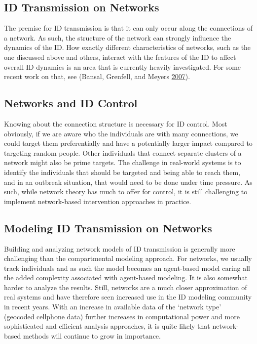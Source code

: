 \documentclass[]{article}
\theoremstyle{definition}
\theoremstyle{definition}
\theoremstyle{definition}
\theoremstyle{remark}
\begin{document}
\subsection{ID Transmission on
Networks}\label{id-transmission-on-networks}

The premise for ID transmission is that it can only occur along the
connections of a network. As such, the structure of the network can
strongly influence the dynamics of the ID. How exactly different
characteristics of networks, such as the one discussed above and others,
interact with the features of the ID to affect overall ID dynamics is an
area that is currently heavily investigated. For some recent work on
that, see (Bansal, Grenfell, and Meyers
\protect\hyperlink{ref-bansal07}{2007}).

\subsection{Networks and ID Control}\label{networks-and-id-control}

Knowing about the connection structure is necessary for ID control. Most
obviously, if we are aware who the individuals are with many
connections, we could target them preferentially and have a potentially
larger impact compared to targeting random people. Other individuals
that connect separate clusters of a network might also be prime targets.
The challenge in real-world systems is to identify the individuals that
should be targeted and being able to reach them, and in an outbreak
situation, that would need to be done under time pressure. As such,
while network theory has much to offer for control, it is still
challenging to implement network-based intervention approaches in
practice.

\subsection{Modeling ID Transmission on
Networks}\label{modeling-id-transmission-on-networks}

Building and analyzing network models of ID transmission is generally
more challenging than the compartmental modeling approach. For networks,
we usually track individuals and as such the model becomes an
agent-based model caring all the added complexity associated with
agent-based modeling. It is also somewhat harder to analyze the results.
Still, networks are a much closer approximation of real systems and have
therefore seen increased use in the ID modeling community in recent
years. With an increase in available data of the `network type'
(geocoded cellphone data) further increases in computational power and
more sophisticated and efficient analysis approaches, it is quite likely
that network-based methods will continue to grow in importance.
\end{document}
